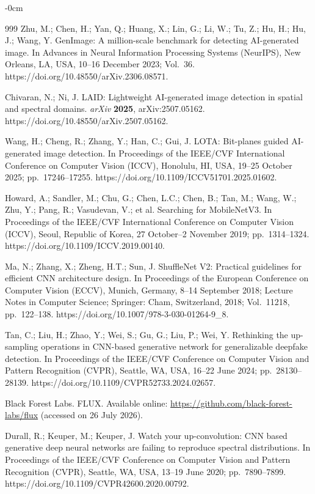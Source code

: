 \documentclass[applsci,article,submit,pdftex,moreauthors]{Definitions/mdpi}
\begin{document}
\begin{adjustwidth}{-\extralength}{0cm}
{\begin{thebibliography}{999}
Zhu, M.; Chen, H.; Yan, Q.; Huang, X.; Lin, G.; Li, W.; Tu, Z.; Hu, H.; Hu, J.; Wang, Y. GenImage: A million-scale benchmark for detecting AI-generated image. In Advances in Neural Information Processing Systems (NeurIPS), New Orleans, LA, USA, 10--16 December 2023; Vol.~36. https://doi.org/10.48550/arXiv.2306.08571.

Chivaran, N.; Ni, J. LAID: Lightweight AI-generated image detection in spatial and spectral domains. {\em arXiv} {\bf 2025}, arXiv:2507.05162. https://doi.org/10.48550/arXiv.2507.05162.

Wang, H.; Cheng, R.; Zhang, Y.; Han, C.; Gui, J. LOTA: Bit-planes guided AI-generated image detection. In Proceedings of the IEEE/CVF International Conference on Computer Vision (ICCV), Honolulu, HI, USA, 19--25 October 2025; pp.~17246--17255. https://doi.org/10.1109/ICCV51701.2025.01602.

Howard, A.; Sandler, M.; Chu, G.; Chen, L.C.; Chen, B.; Tan, M.; Wang, W.; Zhu, Y.; Pang, R.; Vasudevan, V.; et al. Searching for MobileNetV3. In Proceedings of the IEEE/CVF International Conference on Computer Vision (ICCV), Seoul, Republic of Korea, 27 October--2 November 2019; pp.~1314--1324. https://doi.org/10.1109/ICCV.2019.00140.

Ma, N.; Zhang, X.; Zheng, H.T.; Sun, J. ShuffleNet V2: Practical guidelines for efficient CNN architecture design. In Proceedings of the European Conference on Computer Vision (ECCV), Munich, Germany, 8--14 September 2018; Lecture Notes in Computer Science; Springer: Cham, Switzerland, 2018; Vol.~11218, pp.~122--138. https://doi.org/10.1007/978-3-030-01264-9\_8.

Tan, C.; Liu, H.; Zhao, Y.; Wei, S.; Gu, G.; Liu, P.; Wei, Y. Rethinking the up-sampling operations in CNN-based generative network for generalizable deepfake detection. In Proceedings of the IEEE/CVF Conference on Computer Vision and Pattern Recognition (CVPR), Seattle, WA, USA, 16--22 June 2024; pp.~28130--28139. https://doi.org/10.1109/CVPR52733.2024.02657.

Black Forest Labs. FLUX. Available online: \url{https://github.com/black-forest-labs/flux} (accessed on 26 July 2026).

Durall, R.; Keuper, M.; Keuper, J. Watch your up-convolution: CNN based generative deep neural networks are failing to reproduce spectral distributions. In Proceedings of the IEEE/CVF Conference on Computer Vision and Pattern Recognition (CVPR), Seattle, WA, USA, 13--19 June 2020; pp.~7890--7899. https://doi.org/10.1109/CVPR42600.2020.00792.


\end{thebibliography}}
\end{adjustwidth}
\end{document}
